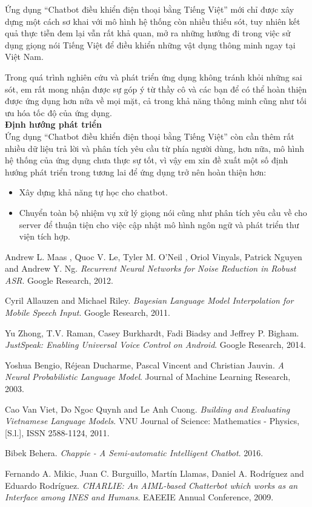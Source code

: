 \documentclass[12pt]{report}
\begin{document}
Ứng dụng ``Chatbot điều khiển điện thoại bằng Tiếng Việt'' mới chỉ được xây dựng một cách sơ khai với mô hình hệ thống còn nhiều thiếu sót, tuy nhiên kết quả thực tiễn đem lại vẫn rất khả quan, mở ra những hướng đi trong việc sử dụng giọng nói Tiếng Việt để điều khiển những vật dụng thông minh ngay tại Việt Nam.

Trong quá trình nghiên cứu và phát triển ứng dụng không tránh khỏi những sai sót, em rất mong nhận được sự góp ý từ thầy cô và các bạn để có thể hoàn thiện được ứng dụng hơn nữa về mọi mặt, cả trong khả năng thông minh cũng như tối ưu hóa tốc độ của ứng dụng. \\[0.4cm]
\noindent \textbf{\large Định hướng phát triển\\[0.4cm]}
Ứng dụng ``Chatbot điều khiển điện thoại bằng Tiếng Việt'' còn cần thêm rất nhiều dữ liệu trả lời và phân tích yêu cầu từ phía người dùng, hơn nữa, mô hình hệ thống của ứng dụng chưa thực sự tốt, vì vậy em xin đề xuất một số định hướng phát triển trong tương lai để ứng dụng trở nên hoàn thiện hơn:

\begin{itemize}
	\item Xây dựng khả năng tự học cho chatbot.
	\item Chuyển toàn bộ nhiệm vụ xử lý giọng nói cũng như phân tích yêu cầu về cho server để thuận tiện cho việc cập nhật mô hình ngôn ngữ và phát triển thư viện tích hợp.
\end{itemize}

\begin{thebibliography}{9}
Andrew L. Maas , Quoc V. Le, Tyler M. O’Neil , Oriol Vinyals, Patrick Nguyen and Andrew Y. Ng. 
\textit{Recurrent Neural Networks for Noise Reduction in Robust ASR}. 
Google Research, 2012.

Cyril Allauzen and Michael Riley. 
\textit{Bayesian Language Model Interpolation for Mobile Speech Input}. 
Google Research, 2011.

Yu Zhong, T.V. Raman, Casey Burkhardt, Fadi Biadsy and Jeffrey P. Bigham. 
\textit{JustSpeak: Enabling Universal Voice Control on Android}. 
Google Research, 2014.

Yoshua Bengio, Réjean Ducharme, Pascal Vincent and Christian Jauvin. 
\textit{A Neural Probabilistic Language Model}. 
Journal of Machine Learning Research, 2003.

Cao Van Viet, Do Ngoc Quynh and Le Anh Cuong. 
\textit{Building and Evaluating Vietnamese Language Models}. 
VNU Journal of Science: Mathematics - Physics, [S.l.], ISSN 2588-1124, 2011.

Bibek Behera. 
\textit{Chappie - A Semi-automatic Intelligent Chatbot}. 
2016.

Fernando A. Mikic, Juan C. Burguillo, Martín Llamas, Daniel A. Rodríguez and Eduardo Rodríguez. 
\textit{CHARLIE: An AIML-based Chatterbot which works as an Interface among INES and Humans}. 
EAEEIE Annual Conference, 2009.

\end{thebibliography}

\end{document}

